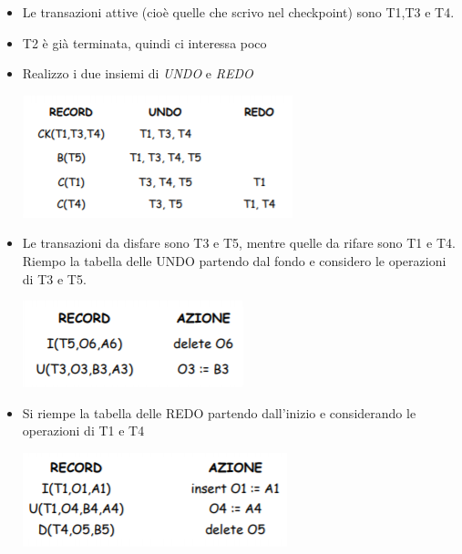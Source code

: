 \begin{itemize}
	\item Le transazioni attive (cioè quelle che scrivo nel checkpoint) sono T1,T3 e T4.
	\item T2 è già terminata, quindi ci interessa poco
	\item Realizzo i due insiemi di \emph{UNDO} e \emph{REDO}
	\begin{center}
		\includegraphics{images/137.PNG}
	\end{center}
	\item Le transazioni da disfare sono T3 e T5, mentre quelle da rifare sono T1 e T4. Riempo la tabella delle UNDO partendo dal fondo e considero le operazioni di T3 e T5.
	\begin{center}
		\includegraphics{images/138.PNG}
	\end{center}
	\item Si riempe la tabella delle REDO partendo dall'inizio e considerando le operazioni di T1 e T4
	\begin{center}
		\includegraphics{images/139.PNG}
	\end{center}
\end{itemize}
